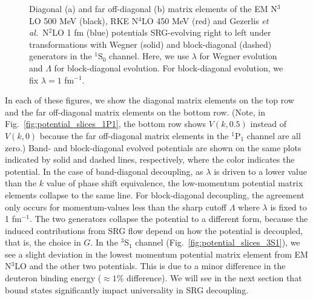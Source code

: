 \documentclass[preprintnumbers,floatfix,aps,prc,preprint,nofootinbib]{revtex4-1}
\begin{document}
%
\begin{figure}[H]
	\centering
	
	\caption{Diagonal (a) and far off-diagonal (b) matrix elements of the EM N$^3$LO 500 MeV (black), RKE N$^4$LO 450 MeV (red) and Gezerlis \textit{et al.}~N$^2$LO 1 fm (blue) potentials SRG-evolving right to left under transformations with Wegner (solid) and block-diagonal (dashed) generators in the $^1$S$_0$ channel. Here, we use $\lambda$ for Wegner evolution and $\Lambda$ for block-diagonal evolution. For block-diagonal evolution, we fix $\lambda=1$ fm$^{-1}$.}
	\label{fig:potential_slices_1S0}
\end{figure}
%
In each of these figures, we show the diagonal matrix elements on the top row and the far off-diagonal matrix elements on the bottom row. (Note, in Fig.~\ref{fig:potential_slices_1P1}, the bottom row shows $V(k,0.5)$ instead of $V(k,0)$ because the far off-diagonal matrix elements in the $^1$P$_1$ channel are all zero.) Band- and block-diagonal evolved potentials are shown on the same plots indicated by solid and dashed lines, respectively, where the color indicates the potential. In the case of band-diagonal decoupling, as $\lambda$ is driven to a lower value than the $k$ value of phase shift equivalence, the low-momentum potential matrix elements collapse to the same line. For block-diagonal decoupling, the agreement only occurs for momentum-values less than the sharp cutoff $\Lambda$ where $\lambda$ is fixed to 1 fm$^{-1}$. The two generators collapse the potential to a different form, because the induced contributions from SRG flow depend on how the potential is decoupled, that is, the choice in $G$. In the $^3$S$_1$ channel (Fig.~\ref{fig:potential_slices_3S1}), we see a slight deviation in the lowest momentum potential matrix element from EM N$^3$LO and the other two potentials. This is due to a minor difference in the deuteron binding energy ($\approx 1\%$ difference). We will see in the next section that bound states significantly impact universality in SRG decoupling.
\end{document}
